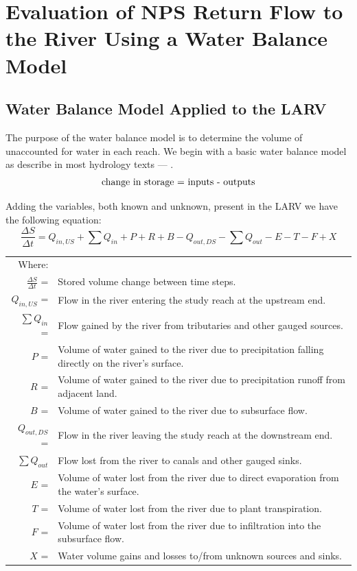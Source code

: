 \renewcommand{\thechapter}{4}
\chapter{Evaluation of NPS Return Flow to the River Using a Water Balance Model}
\label{chap:WaterBalanceModel}

\begin{linenumbers}
\section{Water Balance Model Applied to the LARV}
\label{sec:AppliedWaterModel}

The purpose of the water balance model is to determine the volume of unaccounted for water in each reach.  We begin with a basic water balance model as describe in most hydrology texts --- \parencite{wanielista1997}.
\begin{equation}
	\textnormal{change in storage = inputs - outputs} \nonumber
\end{equation}

Adding the variables, both known and unknown, present in the LARV we have the following equation:
\begin{equation}
\label{eq:water1}
	\frac{\Delta S}{\Delta t} = Q_{in,US} + \sum Q_{in} + P + R + B - Q_{out,DS} - \sum Q_{out} - E - T - F + X
\end{equation}
\begin{longtable}{r p{5.5in}}
	Where: \\
	$\displaystyle \frac{\Delta S}{\Delta t}$ =&Stored volume change between time steps.\\
	$ Q_{in,US} $ = & Flow in the river entering the study reach at the upstream end.\\
	$ \displaystyle \sum Q_{in} $ = & Flow gained by the river from tributaries and other gauged sources.\\
	$ P $ = & Volume of water gained to the river due to precipitation falling directly on the river's surface.\\
	$ R $ = & Volume of water gained to the river due to precipitation runoff from adjacent land. \\
	$ B $ = & Volume of water gained to the river due to subsurface flow. \\
	$ Q_{out,DS} $ = & Flow in the river leaving the study reach at the downstream end.\\
	$ \displaystyle \sum Q_{out} $ & Flow lost from the river to canals and other gauged sinks.\\
	$ E $ = & Volume of water lost from the river due to direct evaporation from the water's surface.\\
	$ T $ = & Volume of water lost from the river due to plant transpiration.\\
	$ F $ = & Volume of water lost from the river due to infiltration into the subsurface flow.\\
	$ X $ = & Water volume gains and losses to/from unknown sources and sinks.\\
\end{longtable}


\end{linenumbers}
